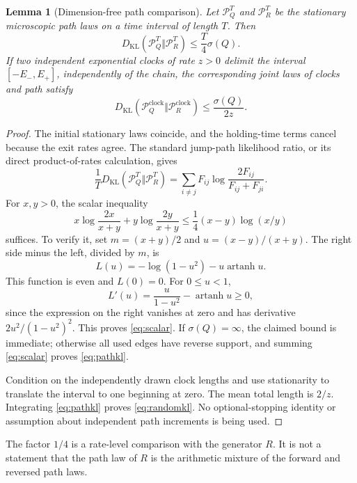 \documentclass[11pt,a4paper]{article}
\newtheorem{lemma}[theorem]{Lemma}
\newcommand{\KL}{D_{\mathrm{KL}}}
\newcommand{\sig}{\sigma}
\begin{document}
\begin{lemma}[Dimension-free path comparison]\label{lem:path}
Let $\mathcal P_Q^T$ and $\mathcal P_R^T$ be the stationary microscopic path laws on a time interval of length $T$. Then
\begin{equation}\label{eq:pathkl}
 \KL(\mathcal P_Q^T\Vert\mathcal P_R^T)
 \leq\frac{T}{4}\sig(Q).
\end{equation}
If two independent exponential clocks of rate $z>0$ delimit the interval $[-E_-,E_+]$, independently of the chain, the corresponding joint laws of clocks and path satisfy
\begin{equation}\label{eq:randomkl}
 \KL(\mathcal P_Q^{\mathrm{clock}}\Vert
             \mathcal P_R^{\mathrm{clock}})
 \leq \frac{\sig(Q)}{2z}.
\end{equation}
\end{lemma}
\begin{proof}
The initial stationary laws coincide, and the holding-time terms cancel because the exit rates agree. The standard jump-path likelihood ratio, or its direct product-of-rates calculation, gives
\[
 \frac1T\KL(\mathcal P_Q^T\Vert\mathcal P_R^T)
 =\sum_{i\ne j}F_{ij}\log\frac{2F_{ij}}{F_{ij}+F_{ji}}.
\]
For $x,y>0$, the scalar inequality
\begin{equation}\label{eq:scalar}
 x\log\frac{2x}{x+y}+y\log\frac{2y}{x+y}
 \leq\frac14(x-y)\log(x/y)
\end{equation}
suffices. To verify it, set $m=(x+y)/2$ and $u=(x-y)/(x+y)$. The right side minus the left, divided by $m$, is
\[
 L(u)=-\log(1-u^2)-u\operatorname{artanh}u.
\]
This function is even and $L(0)=0$. For $0\leq u<1$,
\[
 L'(u)=\frac{u}{1-u^2}-\operatorname{artanh}u\geq0,
\]
since the expression on the right vanishes at zero and has derivative $2u^2/(1-u^2)^2$. This proves \eqref{eq:scalar}. If $\sig(Q)=\infty$, the claimed bound is immediate; otherwise all used edges have reverse support, and summing \eqref{eq:scalar} proves \eqref{eq:pathkl}.

Condition on the independently drawn clock lengths and use stationarity to translate the interval to one beginning at zero. The mean total length is $2/z$. Integrating \eqref{eq:pathkl} proves \eqref{eq:randomkl}. No optional-stopping identity or assumption about independent path increments is being used.
\end{proof}

The factor $1/4$ is a rate-level comparison with the generator $R$. It is not a statement that the path law of $R$ is the arithmetic mixture of the forward and reversed path laws.
\end{document}
